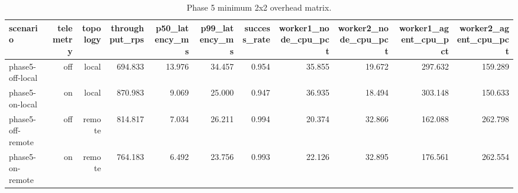 \begin{table}[t]
\centering
\caption{Phase 5 minimum 2x2 overhead matrix.}
\label{tab:phase5_overhead_matrix}
\begin{tabular}{lrrrrrrrrrr}
\hline
scenario & telemetry & topology & throughput\_rps & p50\_latency\_ms & p99\_latency\_ms & success\_rate & worker1\_node\_cpu\_pct & worker2\_node\_cpu\_pct & worker1\_agent\_cpu\_pct & worker2\_agent\_cpu\_pct \\
\hline
phase5-off-local & off & local & 694.833 & 13.976 & 34.457 & 0.954 & 35.855 & 19.672 & 297.632 & 159.289 \\
phase5-on-local & on & local & 870.983 & 9.069 & 25.000 & 0.947 & 36.935 & 18.494 & 303.148 & 150.633 \\
phase5-off-remote & off & remote & 814.817 & 7.034 & 26.211 & 0.994 & 20.374 & 32.866 & 162.088 & 262.798 \\
phase5-on-remote & on & remote & 764.183 & 6.492 & 23.756 & 0.993 & 22.126 & 32.895 & 176.561 & 262.554 \\
\hline
\end{tabular}
\end{table}
